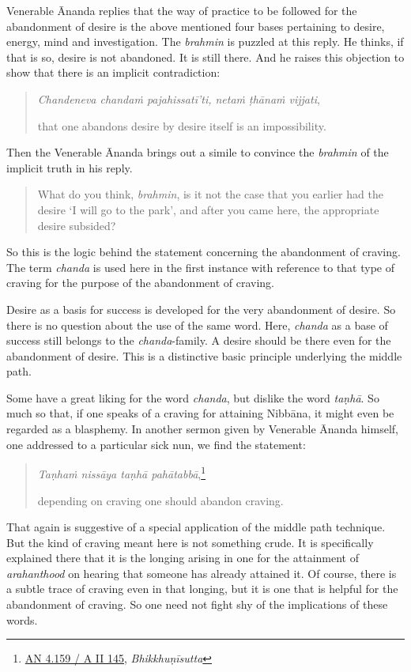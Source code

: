 Venerable Ānanda replies that the way of practice to be followed for the abandonment of desire is the above mentioned four bases pertaining to desire, energy, mind and investigation. The \emph{brahmin} is puzzled at this reply. He thinks, if that is so, desire is not abandoned. It is still there. And he raises this objection to show that there is an implicit contradiction:

\begin{quote}
\emph{Chandeneva chandaṁ pajahissatī'ti, netaṁ ṭhānaṁ vijjati},

that one abandons desire by desire itself is an impossibility.
\end{quote}

Then the Venerable Ānanda brings out a simile to convince the \emph{brahmin} of the implicit truth in his reply.

\begin{quote}
What do you think, \emph{brahmin}, is it not the case that you earlier had the desire `I will go to the park', and after you came here, the appropriate desire subsided?
\end{quote}

So this is the logic behind the statement concerning the abandonment of craving. The term \emph{chanda} is used here in the first instance with reference to that type of craving for the purpose of the abandonment of craving.

Desire as a basis for success is developed for the very abandonment of desire. So there is no question about the use of the same word. Here, \emph{chanda} as a base of success still belongs to the \emph{chanda}-family. A desire should be there even for the abandonment of desire. This is a distinctive basic principle underlying the middle path.

Some have a great liking for the word \emph{chanda}, but dislike the word \emph{taṇhā}. So much so that, if one speaks of a craving for attaining Nibbāna, it might even be regarded as a blasphemy. In another sermon given by Venerable Ānanda himself, one addressed to a particular sick nun, we find the statement:

\begin{quote}
\emph{Taṇhaṁ nissāya taṇhā pahātabbā},\footnote{\href{https://suttacentral.net/an4.159/pli/ms}{AN 4.159 / A II 145}, \emph{Bhikkhuṇīsutta}}

depending on craving one should abandon craving.
\end{quote}

That again is suggestive of a special application of the middle path technique. But the kind of craving meant here is not something crude. It is specifically explained there that it is the longing arising in one for the attainment of \emph{arahanthood} on hearing that someone has already attained it. Of course, there is a subtle trace of craving even in that longing, but it is one that is helpful for the abandonment of craving. So one need not fight shy of the implications of these words.

